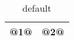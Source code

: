 \begin{table}[htdp]
\begin{center}
\begin{tabular}{|c|c|} \hline
	@1@ & @2@ \\ \hline
\end{tabular}
\end{center}
\caption{default}
\label{default}
\end{table}
